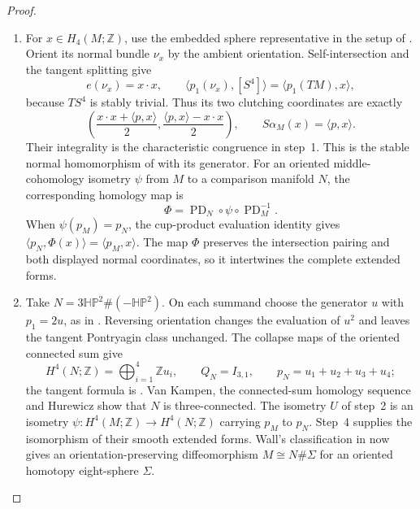 \documentclass[11pt,a4paper]{article}
\numberwithin{equation}{section}
\theoremstyle{definition}
\begin{document}
\begin{proof}
\begin{enumerate}[label=\arabic*.]
\item For $x\in H_4(M;\mathbb Z)$, use the embedded sphere
representative in the setup of
\cite[\S3.3, pp.~11--12]{IVVWallForm}. Orient its normal bundle
$\nu_x$ by the ambient orientation. Self-intersection and the
tangent splitting give
\[
e(\nu_x)=x\cdot x,\qquad
\langle p_1(\nu_x),[S^4]\rangle=\langle p_1(TM),x\rangle,
\]
because $TS^4$ is stably trivial. Thus its two clutching coordinates
are exactly
\[
\left(\frac{x\cdot x+\langle p,x\rangle}{2},
      \frac{\langle p,x\rangle-x\cdot x}{2}\right),
\qquad S\alpha_M(x)=\langle p,x\rangle.
\]
Their integrality is the characteristic congruence in step~1.
This is the stable normal homomorphism of
\cite[Definition~3.6, p.~12]{IVVWallForm} with its generator.
For an oriented middle-cohomology isometry $\psi$ from $M$ to a
comparison manifold $N$, the corresponding homology map is
\[
\Phi=\operatorname{PD}_N\circ\psi\circ\operatorname{PD}_M^{-1}.
\]
When $\psi(p_M)=p_N$, the cup-product evaluation identity gives
$\langle p_N,\Phi(x)\rangle=\langle p_M,x\rangle$.
The map $\Phi$ preserves the intersection pairing and both displayed
normal coordinates, so it intertwines the complete extended forms.

\item Take $N=3\mathbb H\mathbb P^2\#(-\mathbb H\mathbb P^2)$.
On each summand choose the generator $u$ with $p_1=2u$, as in
\cite[Lemma~2.1, p.~5]{ffMandal}. Reversing orientation changes
the evaluation of $u^2$ and leaves the tangent Pontryagin class
unchanged. The collapse maps of the oriented connected sum give
\[
H^4(N;\mathbb Z)=\bigoplus_{i=1}^4\mathbb Z u_i,
\qquad Q_N=I_{3,1},\qquad p_N=u_1+u_2+u_3+u_4;
\]
the tangent formula is
\cite[Theorem~2.4, p.~7]{ffMandal}.
Van Kampen, the connected-sum homology sequence and Hurewicz show
that $N$ is three-connected. The isometry $U$ of step~2 is an
isometry $\psi:H^4(M;\mathbb Z)\to H^4(N;\mathbb Z)$ carrying
$p_M$ to $p_N$. Step~4 supplies the isomorphism of their smooth
extended forms. Wall's classification in
\cite[Theorem~3.7(1), pp.~13--14]{IVVWallForm} now gives an
orientation-preserving diffeomorphism
$M\cong N\#\Sigma$ for an oriented homotopy eight-sphere $\Sigma$.


\end{enumerate}
\end{proof}
\end{document}
